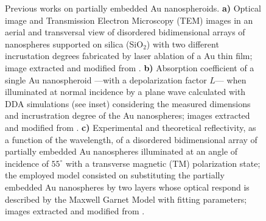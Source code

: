 \begin{figure}[b!]
\centering
\hspace*{-3.75em}%
  \vspace*{-.75em}
  \caption[Backgrounds]{Previous works on partially embedded Au nanospheroids. \textbf{a)} Optical image and Transmission Electron Microscopy (TEM) images in an aerial and transversal view of disordered bidimensional arrays of nanospheres supported on silica  (SiO$_2$)  with two different incrustation degrees fabricated by laser ablation of a Au thin film; image extracted and modified from \cite{meng_anisotropic_2015}. \textbf{b) }  Absorption coefficient of a single Au nanospheroid ---with a depolarization factor $L$--- when illuminated at normal incidence by a plane wave calculated with DDA simulations (see inset) considering the measured dimensions and incrustration degree of the Au nanospheres; images extracted and modified from \cite{meng_anisotropic_2015}.  \textbf{c)} Experimental and theoretical reflectivity, as a function of the wavelength, of a disordered bidimensional array of partially embedded Au nanospheres illuminated at an angle of incidence of $55^\circ$ with a transverse magnetic (TM) polarization state; the employed model consisted on substituting the partially embedded Au nanospheres by two layers whose optical respond is described by the Maxwell Garnet Model with fitting parameters; images extracted and modified from \cite{moirangthem_enhanced_2012}.
   }
\label{fig:IncPapers}
\end{figure}

